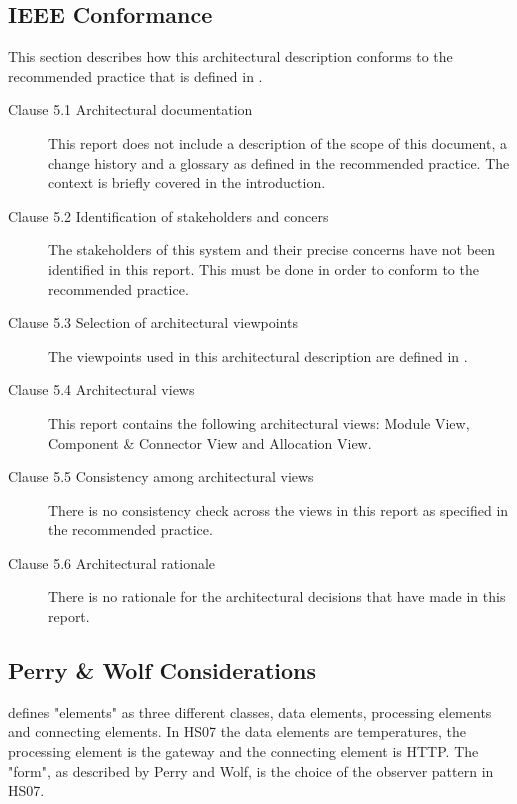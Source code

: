 \documentclass[a4paper,10pt]{article}
\begin{document}
\subsection{IEEE Conformance}


This section describes how this architectural description conforms to the recommended practice
that is defined in \cite{ieeerecommendedpractice}.

\begin{description}
	\item[Clause 5.1 Architectural documentation] This report does not include a description of the
		scope of this document, a change history and a glossary as defined in the recommended practice.
		The context is briefly covered in the introduction.
	\item[Clause 5.2 Identification of stakeholders and concers] The stakeholders of this system and
		their precise concerns have not been identified in this report. This must be done in order to
		conform to the recommended practice.
	\item[Clause 5.3 Selection of architectural viewpoints] The viewpoints used in this architectural
		description are defined in \cite{christensen2004archdesc}.
	\item[Clause 5.4 Architectural views] This report contains the following architectural views: Module
		View, Component \& Connector View and Allocation View.
	\item[Clause 5.5 Consistency among architectural views] There is no consistency check across the views
		in this report as specified in the recommended practice.
	\item[Clause 5.6 Architectural rationale] There is no rationale for the architectural decisions
		that have made in this report.
\end{description}


\subsection{Perry \& Wolf Considerations}

\cite{perrywolf1992} defines "elements" as three different classes, data elements,
processing elements and connecting elements. In HS07 the data elements are
temperatures, the processing element is the gateway and the connecting element
is HTTP. The "form", as described by Perry and Wolf, is the choice of the observer
pattern in HS07.
\end{document}
